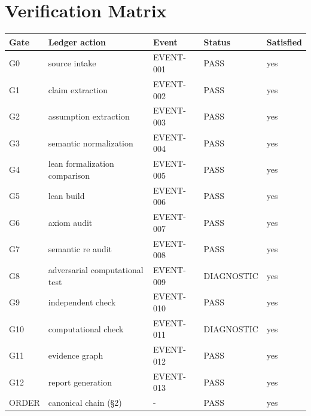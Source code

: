 \documentclass[11pt]{article}
\begin{document}
\section{Verification Matrix}
\begin{longtable}{lllll}
\toprule Gate & Ledger action & Event & Status & Satisfied \\ \midrule \endhead
G0 & source intake & EVENT-001 & PASS & yes \\
G1 & claim extraction & EVENT-002 & PASS & yes \\
G2 & assumption extraction & EVENT-003 & PASS & yes \\
G3 & semantic normalization & EVENT-004 & PASS & yes \\
G4 & lean formalization comparison & EVENT-005 & PASS & yes \\
G5 & lean build & EVENT-006 & PASS & yes \\
G6 & axiom audit & EVENT-007 & PASS & yes \\
G7 & semantic re audit & EVENT-008 & PASS & yes \\
G8 & adversarial computational test & EVENT-009 & DIAGNOSTIC & yes \\
G9 & independent check & EVENT-010 & PASS & yes \\
G10 & computational check & EVENT-011 & DIAGNOSTIC & yes \\
G11 & evidence graph & EVENT-012 & PASS & yes \\
G12 & report generation & EVENT-013 & PASS & yes \\
ORDER & canonical chain (\S{}2) & - & PASS & yes \\
\bottomrule
\end{longtable}
\end{document}
